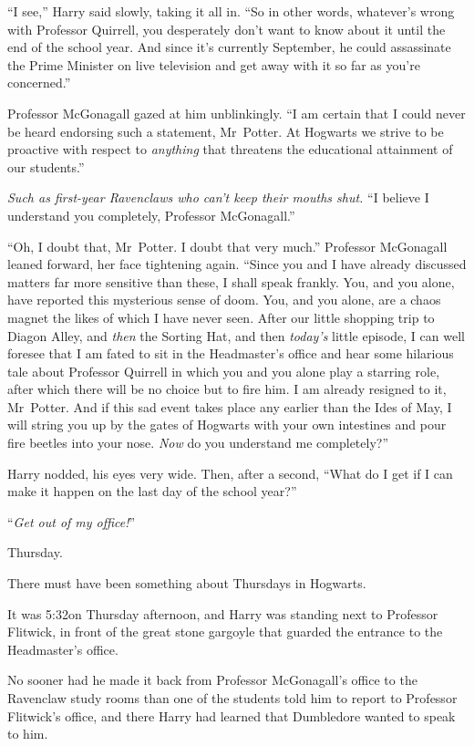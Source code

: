 “I see,” Harry said slowly, taking it all in. “So in other words, whatever’s wrong with Professor Quirrell, you desperately don’t want to know about it until the end of the school year. And since it’s currently September, he could assassinate the Prime Minister on live television and get away with it so far as you’re concerned.”

Professor McGonagall gazed at him unblinkingly. “I am certain that I could never be heard endorsing such a statement, Mr~Potter. At Hogwarts we strive to be proactive with respect to \emph{anything} that threatens the educational attainment of our students.”

\emph{Such as first-year Ravenclaws who can’t keep their mouths shut.} “I believe I understand you completely, Professor McGonagall.”

“Oh, I doubt that, Mr~Potter. I doubt that very much.” Professor McGonagall leaned forward, her face tightening again. “Since you and I have already discussed matters far more sensitive than these, I shall speak frankly. You, and you alone, have reported this mysterious sense of doom. You, and you alone, are a chaos magnet the likes of which I have never seen. After our little shopping trip to Diagon Alley, and \emph{then} the Sorting Hat, and then \emph{today’s} little episode, I can well foresee that I am fated to sit in the Headmaster’s office and hear some hilarious tale about Professor Quirrell in which you and you alone play a starring role, after which there will be no choice but to fire him. I am already resigned to it, Mr~Potter. And if this sad event takes place any earlier than the Ides of May, I will string you up by the gates of Hogwarts with your own intestines and pour fire beetles into your nose. \emph{Now} do you understand me completely?”

Harry nodded, his eyes very wide. Then, after a second, “What do I get if I can make it happen on the last day of the school year?”

“\emph{Get out of my office!}”

\later

Thursday.

There must have been something about Thursdays in Hogwarts.

It was 5:32\pm on Thursday afternoon, and Harry was standing next to Professor Flitwick, in front of the great stone gargoyle that guarded the entrance to the Headmaster’s office.

No sooner had he made it back from Professor McGonagall’s office to the Ravenclaw study rooms than one of the students told him to report to Professor Flitwick’s office, and there Harry had learned that Dumbledore wanted to speak to him.

